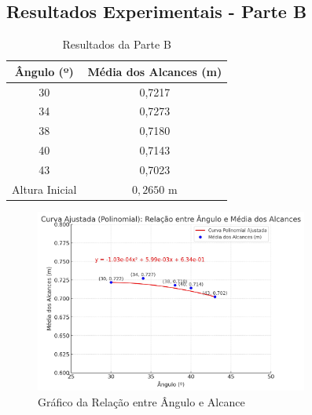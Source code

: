 \documentclass{report}
\begin{document}
\subsection{Resultados Experimentais - Parte B}
\begin{table}[H]
    \centering
    \begin{tabular}{|c|c|}
        \hline
        \textbf{Ângulo (º)} & \textbf{Média dos Alcances (m)} \\
        \hline
        30 & 0,7217 \\
        34 & 0,7273 \\
        38 & 0,7180 \\
        40 & 0,7143 \\
        43 & 0,7023 \\
        \hline
        Altura Inicial & $0,2650$ m \\
        \hline
    \end{tabular}
    \caption{Resultados da Parte B}
    \label{tab:parte_b}
\end{table}

\begin{figure}[H]
    \centering
    \includegraphics[width=0.8\textwidth]{IMAGEM_GRAFICO.jpeg}
    \caption{Gráfico da Relação entre Ângulo e Alcance}
    \label{fig:graficos_alcances}
\end{figure}
\end{document}
